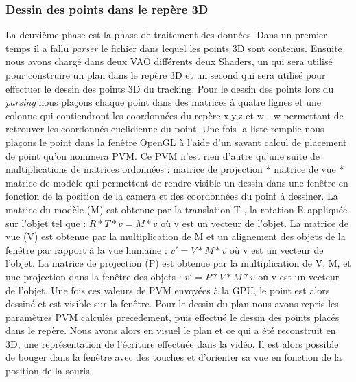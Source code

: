 \subsubsection{Dessin des points dans le repère 3D}
La deuxième phase est la phase de traitement des données. Dans un premier temps il a fallu \textit{parser} le fichier dans lequel les points 3D sont contenus. Ensuite nous avons chargé dans deux VAO différents deux Shaders, un qui sera utilisé pour construire un plan dans le repère 3D et un second qui sera utilisé pour effectuer le dessin des points 3D du tracking. Pour le dessin des points lors du \textit{parsing} nous plaçons chaque point dans des matrices à quatre lignes et une colonne qui contiendront les coordonnées du repère x,y,z et w - w permettant de retrouver les coordonnés euclidienne du point. Une fois la liste remplie nous plaçons le point dans la fenêtre OpenGL à l'aide d'un savant calcul de placement de point qu'on nommera PVM. Ce PVM n'est rien d'autre qu'une suite de multiplications de matrices ordonnées : matrice de projection * matrice de vue * matrice de modèle qui permettent de rendre visible un dessin dans une fenêtre en fonction de la position de la camera et des coordonnées du point à dessiner.
La matrice du modèle (M) est obtenue par la translation T , la rotation R appliquée sur l'objet tel que : $R * T * v = M * v$ où v est un vecteur de l'objet.
La matrice de vue (V) est obtenue par la multiplication de M et un alignement des objets de la fenêtre par rapport à la vue humaine : $v' = V * M * v$ où v est un vecteur de l'objet.
La matrice de projection (P) est obtenue par la multiplication de V, M, et une projection dans la fenêtre des objets : $v' = P * V * M * v$ où v est un vecteur de l'objet.
Une fois ces valeurs de PVM envoyées à la GPU, le point est alors dessiné et est visible sur la fenêtre.
Pour le dessin du plan nous avons repris les paramètres PVM calculés precedement, puis effectué le dessin des points placés dans le repère.
Nous avons alors en visuel le plan et ce qui a été reconstruit en 3D, une représentation de l'écriture effectuée dans la vidéo. Il est alors possible de bouger dans la fenêtre avec des touches et d'orienter sa vue en fonction de la position de la souris.